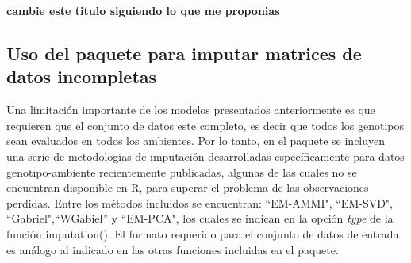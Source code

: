 
{\large{\textbf{cambie este titulo siguiendo lo que me proponias}}}

\subsection{Uso del paquete para imputar matrices de datos incompletas}
\label{subsec:metimp}

Una limitación importante de los modelos presentados anteriormente es que requieren que el conjunto de datos este completo, es decir que todos los genotipos sean evaluados en todos los ambientes. Por lo tanto, en el paquete se incluyen una serie de metodologías de imputación desarrolladas específicamente para datos genotipo-ambiente recientemente publicadas, algunas de las cuales no se encuentran disponible en R, para superar el problema de las observaciones perdidas. Entre los métodos incluidos se encuentran: ``EM-AMMI", ``EM-SVD", ``Gabriel",``WGabiel''  y ``EM-PCA", los cuales se indican en la opción \emph{type} de la función \textcolor{fandango}{imputation()}. El formato requerido para el conjunto de datos de entrada es análogo al indicado en las otras funciones incluidas en el paquete. 

